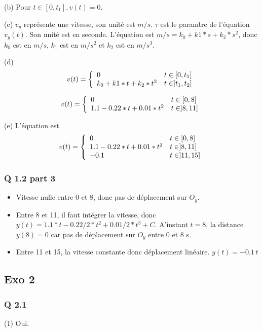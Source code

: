 \documentclass[]{book}
\theoremstyle{definition}
\begin{document}
(b) Pour $t \in [0,t_1], v(t) = 0$.

(c) $v_y$ repr\'esente une vitesse, son unit\'e est $m/s$. $\tau$ est le param\`tre de 
l'\'equation $v_y(t)$. Son unit\'e est en seconde. L'\'equation est $m/s = k_0 + k1*s + k_2*s^2$, 
donc $k_0$ est en $m/s$, $k_1$ est en $m/s^2$ et $k_2$ est en $m/s^3$.

(d)
$$ v(t) =
\left\{ 
\begin{array}{l l}
0 &  t \in [0,t_1] \\
k_0 + k1*t + k_2*t^2  &  t \in ]t_1,t_2] \\
\end{array}
\right. 
$$

$$ v(t) =
\left\{ 
\begin{array}{l l}
0 &  t \in [0,8] \\
1.1 - 0.22*t + 0.01*t^2  &  t \in ]8,11] \\
\end{array}
\right. 
$$

(e) L'\'equation est
$$ v(t) =
\left\{ 
\begin{array}{l l}
0 &  t \in [0,8] \\
1.1 - 0.22*t + 0.01*t^2  &  t \in ]8,11] \\
-0.1  &  t \in ]11,15] \\
\end{array}
\right. 
$$

\subsubsection*{Q 1.2 part 3}
\begin{itemize}
\item Vitesse nulle entre 0 et 8, donc pas de d\'eplacement sur $O_y$.
\item Entre 8 et 11, il faut int\'egrer la vitesse, donc $y(t) = 1.1*t - 0.22/2*t^2 + 
0.01/2*t^3 + C$. A'instant $t=8$, la distance $y(8) = 0$ car pas de d\'eplacement 
sur $O_y$ entre 0 et 8 s.
\item Entre 11 et 15, la vitesse constante donc d\'eplacement lin\'eaire. $y(t) = -0.1\,t$
\end{itemize}

\subsection*{Exo 2}
\subsubsection*{Q 2.1}
(1) Oui.
\end{document}
